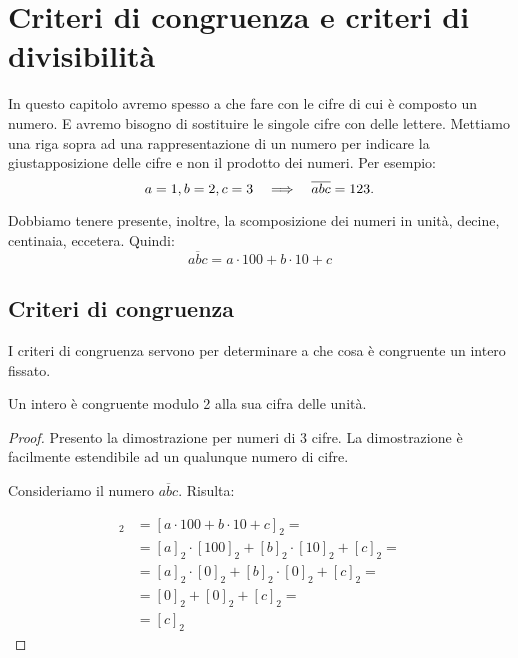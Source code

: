 \chapter{Criteri di congruenza e criteri di divisibilità}

In questo capitolo avremo spesso a che fare con le cifre di cui è composto un numero. E avremo bisogno di sostituire le singole cifre con delle lettere. Mettiamo una riga sopra ad una rappresentazione di un numero per indicare la giustapposizione delle cifre e non il prodotto dei numeri. Per esempio:
\begin{equation*}
    a=1, b=2, c=3  \quad\Longrightarrow\quad  \overline{abc} = 123.
\end{equation*}

Dobbiamo tenere presente, inoltre, la scomposizione dei numeri in unità, decine, centinaia, eccetera. Quindi:
\begin{equation*}
    \overline{abc} = a \cdot 100 + b \cdot 10 + c
\end{equation*}

\section{Criteri di congruenza}

I criteri di congruenza servono per determinare a che cosa è congruente un intero fissato.

\begin{mdframed}
    \begin{teorema}
        Un intero è congruente modulo 2 alla sua cifra delle unità.
    \end{teorema}
    \begin{proof}
        Presento la dimostrazione per numeri di 3 cifre. La dimostrazione è facilmente estendibile ad un qualunque numero di cifre.

        Consideriamo il numero $\overline{abc}$. Risulta:

        \begin{align*}
            [\overline{abc}]_2 &= [a \cdot 100 + b \cdot 10 + c]_2 = \\
            &= [a]_2 \cdot [100]_2 + [b]_2 \cdot [10]_2 + [c]_2 = \\
            &= [a]_2 \cdot [0]_2 + [b]_2 \cdot [0]_2 + [c]_2 = \\
            &= [0]_2 + [0]_2 + [c]_2 = \\
            &= [c]_2
        \end{align*}
    \end{proof}
\end{mdframed}

